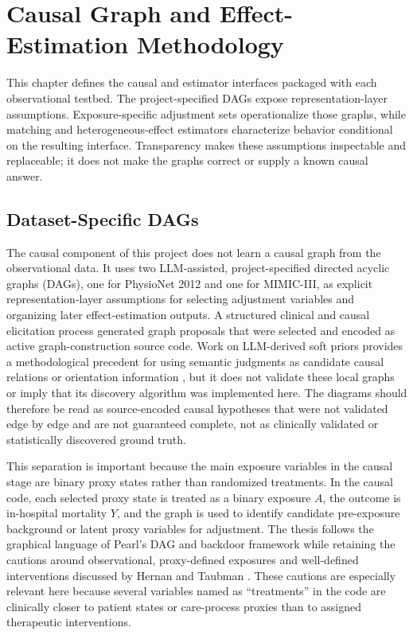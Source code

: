 \chapter{Causal Graph and Effect-Estimation Methodology}
\label{chap:causal-graph-effect-estimation-methodology}

This chapter defines the causal and estimator interfaces packaged with each observational testbed.  The project-specified DAGs expose representation-layer assumptions.  Exposure-specific adjustment sets operationalize those graphs, while matching and heterogeneous-effect estimators characterize behavior conditional on the resulting interface.  Transparency makes these assumptions inspectable and replaceable; it does not make the graphs correct or supply a known causal answer.

\section{Dataset-Specific DAGs}
\label{sec:causal-graph-effect-estimation-methodology:dataset-specific-dags}
The causal component of this project does not learn a causal graph from the observational data.  It uses two LLM-assisted, project-specified directed acyclic graphs (DAGs), one for PhysioNet 2012 and one for MIMIC-III, as explicit representation-layer assumptions for selecting adjustment variables and organizing later effect-estimation outputs.  A structured clinical and causal elicitation process generated graph proposals that were selected and encoded as active graph-construction source code.  Work on LLM-derived soft priors provides a methodological precedent for using semantic judgments as candidate causal relations or orientation information \cite{darvariu_et_al_2024_llm_causal_graph_priors}, but it does not validate these local graphs or imply that its discovery algorithm was implemented here.  The diagrams should therefore be read as source-encoded causal hypotheses that were not validated edge by edge and are not guaranteed complete, not as clinically validated or statistically discovered ground truth.

This separation is important because the main exposure variables in the causal stage are binary proxy states rather than randomized treatments.  In the causal code, each selected proxy state is treated as a binary exposure \(A\), the outcome is in-hospital mortality \(Y\), and the graph is used to identify candidate pre-exposure background or latent proxy variables for adjustment.  The thesis follows the graphical language of Pearl's DAG and backdoor framework while retaining the cautions around observational, proxy-defined exposures and well-defined interventions discussed by Hernan and Taubman \cite{pearl_1995_causal_diagrams,hernan_taubman_2008_well_defined_interventions}.  These cautions are especially relevant here because several variables named as ``treatments'' in the code are clinically closer to patient states or care-process proxies than to assigned therapeutic interventions.

